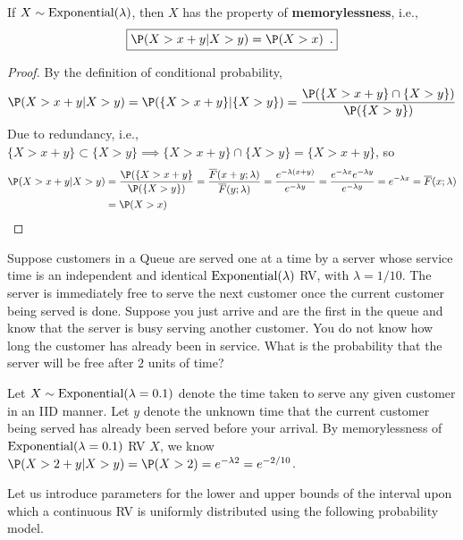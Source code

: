 \begin{prop}\label{P:memorylessnessOfExponentialLambdaRV}
If $X \sim \mbox{{\rm Exponential}}(\lambda)$, then $X$ has the property of {\bf memorylessness}, i.e., 
\begin{equation}
\boxed
{
\P(X>x+y  | X > y) = \P (X > x) \enspace .
} 
\end{equation}
\end{prop}
\begin{proof}
By the definition of conditional probability,
\[
\P(X > x+y | X > y) =\P( \{X>x+y\} |  \{X > y \}) = \frac{\P( \{X>x+y\} \cap \{X > y \})}{\P( \{X>y\} )}
\]
Due to redundancy, i.e., $\{X>x+y\} \subset \{X > y \} \implies \{X>x+y\} \cap \{X > y \}=\{X>x+y\}$, so
\begin{align*}
\P(X > x+y | X > y) 
&=  \frac{\P( \{X>x+y\}}{\P( \{X>y\} )} = \frac{\overline{F}(x+y; \lambda)}{\overline{F}(y; \lambda)} = \frac{e^{-\lambda(x+y)}}{e^{-\lambda y}} 
= \frac{e^{-\lambda x} e^{-\lambda y}}{e^{-\lambda y}}
= e^{-\lambda x} = \overline{F}(x; \lambda) \\
&= \P(X > x)
\end{align*}
\end{proof}

\begin{Exercise}[title={Memoryless Server Times},label={xmemorylessnessOfExponentialLambdaRV}]
Suppose customers in a Queue are served one at a time by a server whose service time is an independent and identical $\mbox{{\rm Exponential}}(\lambda)$ RV, with $\lambda=1/10$. The server is immediately free to serve the next customer once the current customer being served is done.
Suppose you just arrive and are the first in the queue and know that the server is busy serving another customer. You do not know how long the customer has already been in service. 
What is the probability that the server will be free after $2$ units of time?
\end{Exercise}
\begin{Answer}
Let $X \sim \mbox{{\rm Exponential}}(\lambda=0.1)$ denote the time taken to serve any given customer in an IID manner.
Let $y$ denote the unknown time that the current customer being served has already been served before your arrival.
By memorylessness of $\mbox{{\rm Exponential}}(\lambda=0.1)$ RV $X$, we know $\P(X > 2 + y | X > y) = \P(X > 2) = e^{-\lambda 2} = e^{-2/10}$.
\end{Answer}

\bigskip

Let us introduce parameters for the lower and upper bounds of the interval upon which a continuous RV is uniformly distributed using the following probability model.
 
